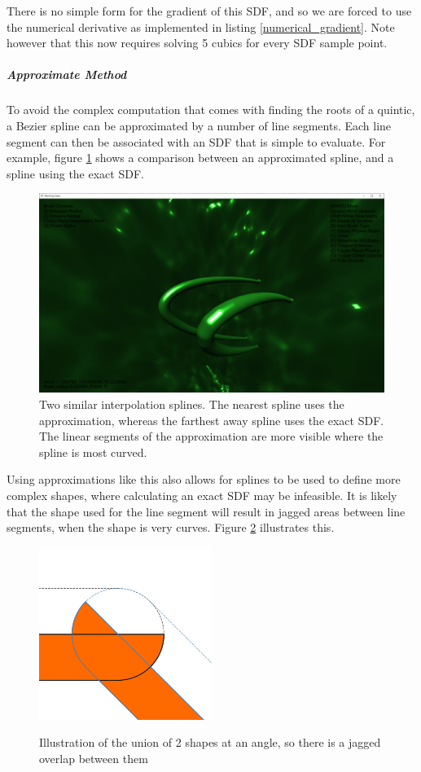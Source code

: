\documentclass{article}
\begin{document}
There is no simple form for the gradient of this SDF, and so we are forced to use the numerical derivative as implemented in listing \ref{numerical_gradient}. Note however that this now requires solving 5 cubics for every SDF sample point.

\subparagraph{Approximate Method}
To avoid the complex computation that comes with finding the roots of a quintic, a Bezier spline can be approximated by a number of line segments. Each line segment can then be associated with an SDF that is simple to evaluate. For example, figure \ref{fig:spline_approximation} shows a comparison between an approximated spline, and a spline using the exact SDF.
\begin{figure}[H]
  \includegraphics[width=\textwidth]{spline_approximation_2.png}
  \caption{Two similar interpolation splines. The nearest spline uses the approximation, whereas the farthest away spline uses the exact SDF. The linear segments of the approximation are more visible where the spline is most curved.}
  \label{fig:spline_approximation}
\end{figure}

Using approximations like this also allows for splines to be used to define more complex shapes, where calculating an exact SDF may be infeasible. It is likely that the shape used for the line segment will result in jagged areas between line segments, when the shape is very curves. Figure \ref{fig:jagged_road} illustrates this. 

\begin{figure}
  \caption{Illustration of the union of 2 shapes at an angle, so there is a jagged overlap between them}
  \includegraphics[width=0.5\textwidth]{jagged_road}
  \label{fig:jagged_road}
\end{figure}
\end{document}
